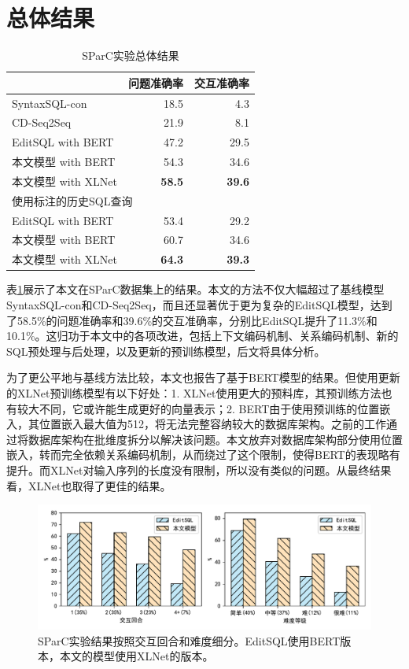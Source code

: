 \section{总体结果}

\begin{table}[]
    \centering
    \caption{SParC实验总体结果}
    \begin{tabular}{l|rr}
    \hline\hline
                        & 问题准确率 & 交互准确率 \\ \hline
    SyntaxSQL-con       & 18.5  & 4.3   \\
    CD-Seq2Seq          & 21.9  & 8.1   \\
    EditSQL with   BERT & 47.2  & 29.5  \\
    本文模型 with BERT      & 54.3  & 34.6  \\
    本文模型 with XLNet     & \textbf{58.5}  & \textbf{39.6}  \\ \hline
    \multicolumn{3}{l}{使用标注的历史SQL查询}    \\ \hline
    EditSQL with   BERT & 53.4  & 29.2  \\
    本文模型 with BERT      & 60.7  & 34.6  \\
    本文模型 with XLNet     & \textbf{64.3}  & \textbf{39.3}  \\ \hline\hline
    \end{tabular}
    \label{overall-results}
\end{table}

表\ref{overall-results}展示了本文在SParC数据集上的结果。本文的方法不仅大幅超过了基线模型SyntaxSQL-con和CD-Seq2Seq，而且还显著优于更为复杂的EditSQL模型，达到了58.5\%的问题准确率和39.6\%的交互准确率，分别比EditSQL提升了11.3\%和10.1\%。这归功于本文中的各项改进，包括上下文编码机制、关系编码机制、新的SQL预处理与后处理，以及更新的预训练模型，后文将具体分析。

为了更公平地与基线方法比较，本文也报告了基于BERT模型的结果。但使用更新的XLNet预训练模型有以下好处：1. XLNet使用更大的预料库，其预训练方法也有较大不同，它或许能生成更好的向量表示；2. BERT由于使用预训练的位置嵌入，其位置嵌入最大值为512，将无法完整容纳较大的数据库架构。之前的工作通过将数据库架构在批维度拆分以解决该问题。本文放弃对数据库架构部分使用位置嵌入，转而完全依赖关系编码机制，从而绕过了这个限制，使得BERT的表现略有提升。而XLNet对输入序列的长度没有限制，所以没有类似的问题。从最终结果看，XLNet也取得了更佳的结果。

\begin{figure}[]
    \centering
    \includegraphics[width=\linewidth]{figure/overall.pdf}
    \caption{SParC实验结果按照交互回合和难度细分。EditSQL使用BERT版本，本文的模型使用XLNet的版本。}
    \label{result-subdivide}
\end{figure}

